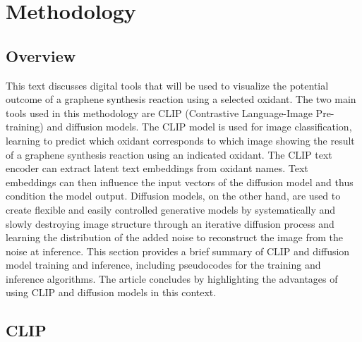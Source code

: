 \documentclass[runningheads]{llncs}
\begin{document}
\section{Methodology}

\subsection{Overview}

This text discusses digital tools that will be used to visualize the potential outcome of a graphene synthesis reaction using a selected oxidant. The two main tools used in this methodology are CLIP (Contrastive Language-Image Pre-training) and diffusion models. The CLIP model is used for image classification, learning to predict which oxidant corresponds to which image showing the result of a graphene synthesis reaction using an indicated oxidant. The CLIP text encoder can extract latent text embeddings from oxidant names. Text embeddings can then influence the input vectors of the diffusion model and thus condition the model output. Diffusion models, on the other hand, are used to create flexible and easily controlled generative models by systematically and slowly destroying image structure through an iterative diffusion process and learning the distribution of the added noise to reconstruct the image from the noise at inference. This section provides a brief summary of CLIP and diffusion model training and inference, including pseudocodes for the training and inference algorithms. The article concludes by highlighting the advantages of using CLIP and diffusion models in this context.

\subsection{CLIP}
\end{document}
